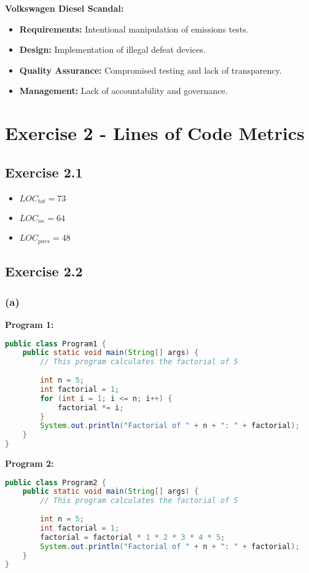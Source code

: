 \documentclass[a4paper]{scrartcl}
\begin{document}
\textbf{Volkswagen Diesel Scandal:}
\begin{itemize}
  \item \textbf{Requirements:} Intentional manipulation of emissions tests.
  \item \textbf{Design:} Implementation of illegal defeat devices.
  \item \textbf{Quality Assurance:} Compromised testing and lack of transparency.
  \item \textbf{Management:} Lack of accountability and governance.
\end{itemize}

\section*{Exercise 2 - Lines of Code Metrics}
\subsection*{Exercise 2.1}

\begin{itemize}
  \item $LOC_{tot} = 73$
  \item $LOC_{ne} = 64$
  \item $LOC_{pars} = 48$
\end{itemize}

\subsection*{Exercise 2.2}
\subsubsection*{(a)}
\textbf{Program 1:}

\begin{lstlisting}[language=Java]
public class Program1 {
    public static void main(String[] args) {
        // This program calculates the factorial of 5
        
        int n = 5;
        int factorial = 1;
        for (int i = 1; i <= n; i++) {
            factorial *= i;
        }
        System.out.println("Factorial of " + n + ": " + factorial);
    }
}
\end{lstlisting}

\textbf{Program 2:}

\begin{lstlisting}[language=Java]
public class Program2 {
    public static void main(String[] args) {
        // This program calculates the factorial of 5
        
        int n = 5;
        int factorial = 1;
        factorial = factorial * 1 * 2 * 3 * 4 * 5;
        System.out.println("Factorial of " + n + ": " + factorial);
    }
}
\end{lstlisting}
\end{document}
